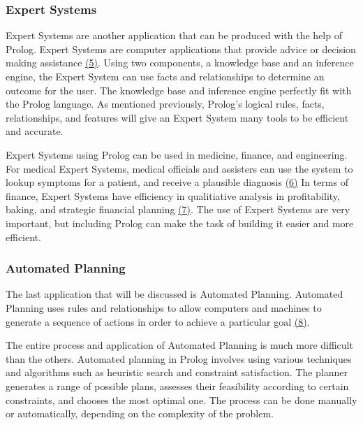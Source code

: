 \documentclass{article}
\theoremstyle{theorem}
\theoremstyle{definition}
\theoremstyle{remark}
\begin{document}
\subsubsection{Expert Systems}
\noindent\newline Expert Systems are another application that can be produced with the help of Prolog. Expert Systems are computer applications that provide advice or decision making assistance \href{https://www.britannica.com/technology/expert-system}{(5)}. Using two components, a knowledge base and an inference engine, the Expert System can use facts and relationships to determine an outcome for the user. The knowledge base and inference engine perfectly fit with the Prolog language. As mentioned previously, Prolog's logical rules, facts, relationships, and features will give an Expert System many tools to be efficient and accurate. 

\noindent\newline Expert Systems using Prolog can be used in medicine, finance, and engineering. For medical Expert Systems, medical officials and assisters can use the system to lookup symptoms for a patient, and receive a plausible diagnosis \href{https://journal.chestnet.org/action/showPdf?pii=S0012-3692%2815%2942851-X%}{(6)} In terms of finance, Expert Systems have efficiency in qualitiative analysis in profitability, baking, and strategic financial planning \href{https://www.routledge.com/Expert-Systems-in-Finance-Smart-Financial-Applications-in-Big-Data-Environments/Metawa-Elhoseny-Hassanien-Hassan/p/book/9780367729011}{(7)}. The use of Expert Systems are very important, but including Prolog can make the task of building it easier and more efficient. 


\subsubsection{Automated Planning}
\noindent\newline The last application that will be discussed is Automated Planning. Automated Planning uses rules and relationships to allow computers and machines to generate a sequence of actions in order to achieve a particular goal \href{https://cw.fel.cvut.cz/old/_media/courses/a4m33pah/planning-course.pdf}{(8)}. 

\noindent\newline The entire process  and application of Automated Planning is much more difficult than the others. Automated planning in Prolog involves using various techniques and algorithms such as heuristic search and constraint satisfaction. The planner generates a range of possible plans, assesses their feasibility according to certain constraints, and chooses the most optimal one. The process can be done manually or automatically, depending on the complexity of the problem.
\end{document}
